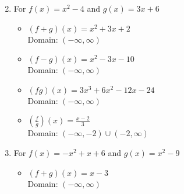 \begin{enumerate}
\begin{multicols}{2}
\end{multicols}


\item For $f(x) = x^2-4$ and $g(x) = 3x+6$

\begin{multicols}{2}

\begin{itemize}

\item $(f+g)(x) = x^2+3x+2$ \\
      Domain: $(-\infty, \infty)$
      
      \vfill
      
      \columnbreak
      
\item $(f-g)(x) = x^2-3x-10$ \\
      Domain:  $(-\infty, \infty)$


\end{itemize}

\end{multicols}

\begin{multicols}{2}

\begin{itemize}

\item $(fg)(x) = 3x^3+6x^2-12x-24$ \\
      Domain: $(-\infty, \infty)$
      
      \vfill
      
      \columnbreak
      
\item $\left(\frac{f}{g}\right)(x) = \frac{x-2}{3}$ \\
      Domain:  $\left(-\infty, -2 \right) \cup \left(-2, \infty \right)$


\end{itemize}

\end{multicols}

\item For $f(x) = -x^2+x+6$ and $g(x) = x^2-9$

\begin{multicols}{2}

\begin{itemize}

\item $(f+g)(x) = x-3$ \\
      Domain: $(-\infty, \infty)$
      

\end{itemize}
\end{multicols}
\end{enumerate}
